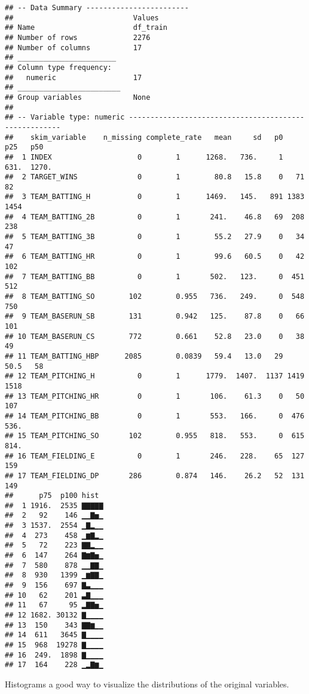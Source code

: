 \documentclass[
]{article}
\begin{document}
\begin{verbatim}
## -- Data Summary ------------------------
##                            Values  
## Name                       df_train
## Number of rows             2276    
## Number of columns          17      
## _______________________            
## Column type frequency:             
##   numeric                  17      
## ________________________           
## Group variables            None    
## 
## -- Variable type: numeric ------------------------------------------------------
##    skim_variable    n_missing complete_rate   mean     sd   p0    p25   p50
##  1 INDEX                    0        1      1268.   736.     1  631.  1270.
##  2 TARGET_WINS              0        1        80.8   15.8    0   71     82 
##  3 TEAM_BATTING_H           0        1      1469.   145.   891 1383   1454 
##  4 TEAM_BATTING_2B          0        1       241.    46.8   69  208    238 
##  5 TEAM_BATTING_3B          0        1        55.2   27.9    0   34     47 
##  6 TEAM_BATTING_HR          0        1        99.6   60.5    0   42    102 
##  7 TEAM_BATTING_BB          0        1       502.   123.     0  451    512 
##  8 TEAM_BATTING_SO        102        0.955   736.   249.     0  548    750 
##  9 TEAM_BASERUN_SB        131        0.942   125.    87.8    0   66    101 
## 10 TEAM_BASERUN_CS        772        0.661    52.8   23.0    0   38     49 
## 11 TEAM_BATTING_HBP      2085        0.0839   59.4   13.0   29   50.5   58 
## 12 TEAM_PITCHING_H          0        1      1779.  1407.  1137 1419   1518 
## 13 TEAM_PITCHING_HR         0        1       106.    61.3    0   50    107 
## 14 TEAM_PITCHING_BB         0        1       553.   166.     0  476    536.
## 15 TEAM_PITCHING_SO       102        0.955   818.   553.     0  615    814.
## 16 TEAM_FIELDING_E          0        1       246.   228.    65  127    159 
## 17 TEAM_FIELDING_DP       286        0.874   146.    26.2   52  131    149 
##      p75  p100 hist 
##  1 1916.  2535 ▇▇▇▇▇
##  2   92    146 ▁▁▇▅▁
##  3 1537.  2554 ▁▇▂▁▁
##  4  273    458 ▁▆▇▂▁
##  5   72    223 ▇▇▂▁▁
##  6  147    264 ▇▆▇▅▁
##  7  580    878 ▁▁▇▇▁
##  8  930   1399 ▁▆▇▇▁
##  9  156    697 ▇▃▁▁▁
## 10   62    201 ▃▇▁▁▁
## 11   67     95 ▂▇▇▅▁
## 12 1682. 30132 ▇▁▁▁▁
## 13  150    343 ▇▇▆▁▁
## 14  611   3645 ▇▁▁▁▁
## 15  968  19278 ▇▁▁▁▁
## 16  249.  1898 ▇▁▁▁▁
## 17  164    228 ▁▂▇▆▁
\end{verbatim}

Histograms a good way to visualize the distributions of the original
variables.
\end{document}
